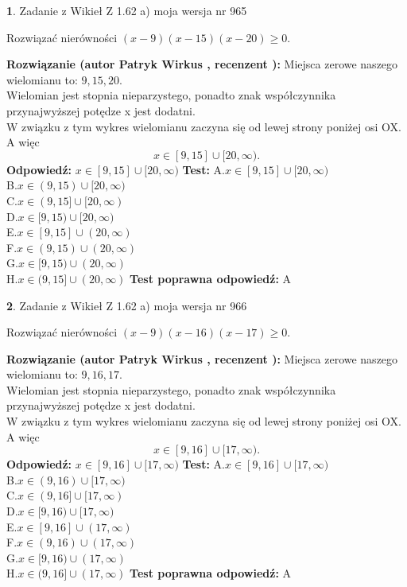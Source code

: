 \documentclass[12pt, a4paper]{article}
\theoremstyle{definition} %
\newtheorem{zad}{}
\newcommand{\zadStart}[1]{\begin{zad}#1\newline}
\newcommand{\zadStop}{\end{zad}}
\newcommand{\rozwStart}[2]{\noindent \textbf{Rozwiązanie (autor #1 , recenzent #2): }\newline}
\newcommand{\rozwStop}{\newline}
\newcommand{\odpStart}{\noindent \textbf{Odpowiedź:}\newline}
\newcommand{\odpStop}{\newline}
\newcommand{\testStart}{\noindent \textbf{Test:}\newline}
\newcommand{\testStop}{\newline}
\newcommand{\kluczStart}{\noindent \textbf{Test poprawna odpowiedź:}\newline}
\newcommand{\kluczStop}{\newline}
\begin{document}
\zadStart{Zadanie z Wikieł Z 1.62 a) moja wersja nr 965}

Rozwiązać nierówności $(x-9)(x-15)(x-20)\ge0$.
\zadStop
\rozwStart{Patryk Wirkus}{}
Miejsca zerowe naszego wielomianu to: $9, 15, 20$.\\
Wielomian jest stopnia nieparzystego, ponadto znak współczynnika przy\linebreak najwyższej potędze x jest dodatni.\\ W związku z tym wykres wielomianu zaczyna się od lewej strony poniżej osi OX. A więc $$x \in [9,15] \cup [20,\infty).$$
\rozwStop
\odpStart
$x \in [9,15] \cup [20,\infty)$
\odpStop
\testStart
A.$x \in [9,15] \cup [20,\infty)$\\
B.$x \in (9,15) \cup [20,\infty)$\\
C.$x \in (9,15] \cup [20,\infty)$\\
D.$x \in [9,15) \cup [20,\infty)$\\
E.$x \in [9,15] \cup (20,\infty)$\\
F.$x \in (9,15) \cup (20,\infty)$\\
G.$x \in [9,15) \cup (20,\infty)$\\
H.$x \in (9,15] \cup (20,\infty)$
\testStop
\kluczStart
A
\kluczStop



\zadStart{Zadanie z Wikieł Z 1.62 a) moja wersja nr 966}

Rozwiązać nierówności $(x-9)(x-16)(x-17)\ge0$.
\zadStop
\rozwStart{Patryk Wirkus}{}
Miejsca zerowe naszego wielomianu to: $9, 16, 17$.\\
Wielomian jest stopnia nieparzystego, ponadto znak współczynnika przy\linebreak najwyższej potędze x jest dodatni.\\ W związku z tym wykres wielomianu zaczyna się od lewej strony poniżej osi OX. A więc $$x \in [9,16] \cup [17,\infty).$$
\rozwStop
\odpStart
$x \in [9,16] \cup [17,\infty)$
\odpStop
\testStart
A.$x \in [9,16] \cup [17,\infty)$\\
B.$x \in (9,16) \cup [17,\infty)$\\
C.$x \in (9,16] \cup [17,\infty)$\\
D.$x \in [9,16) \cup [17,\infty)$\\
E.$x \in [9,16] \cup (17,\infty)$\\
F.$x \in (9,16) \cup (17,\infty)$\\
G.$x \in [9,16) \cup (17,\infty)$\\
H.$x \in (9,16] \cup (17,\infty)$
\testStop
\kluczStart
A
\kluczStop
\end{document}
